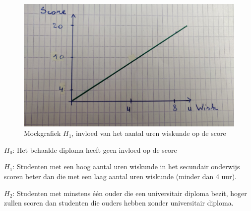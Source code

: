 \documentclass{hogent-article}
\begin{document}
	\begin{figure}[H]
	 	\includegraphics[width=\linewidth]{img/imgg1.jpg}
 		\caption{Mockgrafiek \textbf{$H_1$}, invloed van het aantal uren wiskunde op de score}
	\end{figure}
	 
	\textbf{$H_0$}: Het behaalde diploma heeft geen invloed op de score
	
	\textbf{$H_1$}: Studenten met een hoog aantal uren wiskunde in het secundair onderwijs scoren beter dan die met een laag aantal uren wiskunde (minder dan 4 uur).
	
	\textbf{$H_2$}: Studenten met minstens één ouder die een universitair diploma bezit, hoger zullen scoren dan studenten die ouders hebben zonder universitair diploma.
\end{document}
